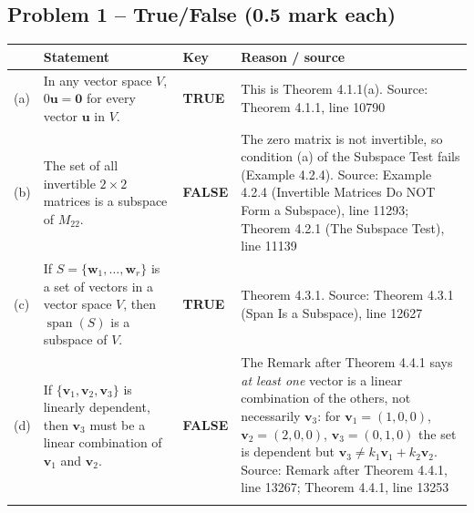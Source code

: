 \documentclass[11pt,a4paper]{article}
\newcommand{\Src}[1]{{\footnotesize\color{black!65}Source: #1}}
\begin{document}
\subsection*{Problem 1 -- True/False (0.5 mark each)}
\begin{tabularx}{\linewidth}{@{}l X l X@{}}\toprule & Statement & Key & Reason / source\\\midrule
(a) & In any vector space $V$, $0\mathbf{u}=\mathbf{0}$ for every vector $\mathbf{u}$ in $V$. & \textbf{TRUE} & This is Theorem 4.1.1(a). \Src{Theorem 4.1.1, line 10790}\\\addlinespace
(b) & The set of all invertible $2\times 2$ matrices is a subspace of $M_{22}$. & \textbf{FALSE} & The zero matrix is not invertible, so condition (a) of the Subspace Test fails (Example 4.2.4). \Src{Example 4.2.4 (Invertible Matrices Do NOT Form a Subspace), line 11293; Theorem 4.2.1 (The Subspace Test), line 11139}\\\addlinespace
(c) & If $S=\{\mathbf{w}_1,\dots,\mathbf{w}_r\}$ is a set of vectors in a vector space $V$, then $\operatorname{span}(S)$ is a subspace of $V$. & \textbf{TRUE} & Theorem 4.3.1. \Src{Theorem 4.3.1 (Span Is a Subspace), line 12627}\\\addlinespace
(d) & If $\{\mathbf{v}_1,\mathbf{v}_2,\mathbf{v}_3\}$ is linearly dependent, then $\mathbf{v}_3$ must be a linear combination of $\mathbf{v}_1$ and $\mathbf{v}_2$. & \textbf{FALSE} & The Remark after Theorem 4.4.1 says \emph{at least one} vector is a linear combination of the others, not necessarily $\mathbf{v}_3$: for $\mathbf{v}_1=(1,0,0)$, $\mathbf{v}_2=(2,0,0)$, $\mathbf{v}_3=(0,1,0)$ the set is dependent but $\mathbf{v}_3\neq k_1\mathbf{v}_1+k_2\mathbf{v}_2$. \Src{Remark after Theorem 4.4.1, line 13267; Theorem 4.4.1, line 13253}\\\addlinespace
\bottomrule\end{tabularx}
\end{document}

